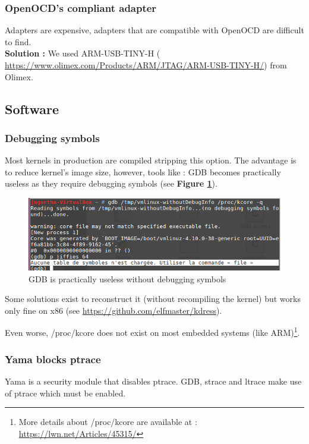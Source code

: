 \subsubsection{OpenOCD's compliant adapter}
Adapters are expensive, adapters that are compatible with OpenOCD are difficult to find.\\
\textbf{Solution : } We used ARM-USB-TINY-H ({\color{blue} \url{https://www.olimex.com/Products/ARM/JTAG/ARM-USB-TINY-H/}}) from Olimex.

\subsection{Software}

\subsubsection{Debugging symbols}
Most kernels in production are compiled stripping this option. The advantage is to reduce kernel's image size, however, tools like : GDB becomes practically useless as they require debugging symbols (see \textbf{Figure \ref{GDB is practically useless without debugging symbols}}). 

\begin{figure}[H]
		\centering
        \includegraphics[scale=0.40]{img/issues/no-debug-symbol.png}
        \caption{GDB is practically useless without debugging symbols}
        \label{GDB is practically useless without debugging symbols}
    \end{figure}


Some solutions exist to reconstruct it (without recompiling the kernel) but works only fine on x86 (see {\color{blue}\url{https://github.com/elfmaster/kdress}}).




Even worse, /proc/kcore does not exist on most embedded systems (like ARM)\footnote{More details about /proc/kcore are available at :  {\color{blue}\url{https://lwn.net/Articles/45315/}}}.


\subsubsection{Yama blocks ptrace}
Yama is a security module that disables ptrace. GDB, strace and ltrace make use of ptrace which must be enabled.\\

